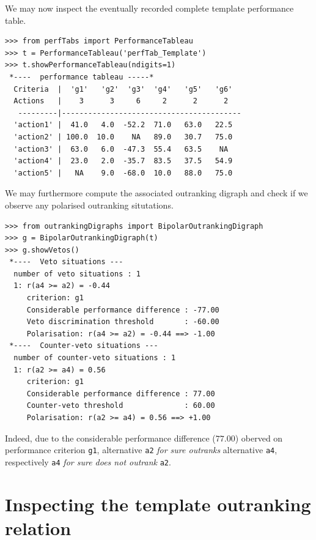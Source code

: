We may now inspect the eventually recorded complete template performance table.
\begin{lstlisting}
>>> from perfTabs import PerformanceTableau   
>>> t = PerformanceTableau('perfTab_Template')
>>> t.showPerformanceTableau(ndigits=1)
 *----  performance tableau -----*
  Criteria  |  'g1'   'g2'  'g3'  'g4'   'g5'   'g6'   
  Actions   |    3      3     6     2      2      2    
   ---------|-----------------------------------------
  'action1' |  41.0   4.0  -52.2  71.0   63.0   22.5  
  'action2' | 100.0  10.0    NA   89.0   30.7   75.0  
  'action3' |  63.0   6.0  -47.3  55.4   63.5    NA   
  'action4' |  23.0   2.0  -35.7  83.5   37.5   54.9  
  'action5' |   NA    9.0  -68.0  10.0   88.0   75.0
\end{lstlisting}

We may furthermore compute the associated outranking digraph and check if we observe any polarised outranking situtations.
\begin{lstlisting}
>>> from outrankingDigraphs import BipolarOutrankingDigraph
>>> g = BipolarOutrankingDigraph(t)
>>> g.showVetos()
 *----  Veto situations ---
  number of veto situations : 1 
  1: r(a4 >= a2) = -0.44
     criterion: g1
     Considerable performance difference : -77.00
     Veto discrimination threshold       : -60.00
     Polarisation: r(a4 >= a2) = -0.44 ==> -1.00
 *----  Counter-veto situations ---
  number of counter-veto situations : 1 
  1: r(a2 >= a4) = 0.56
     criterion: g1
     Considerable performance difference : 77.00
     Counter-veto threshold              : 60.00
     Polarisation: r(a2 >= a4) = 0.56 ==> +1.00
\end{lstlisting}
Indeed, due to the considerable performance difference ($77.00$) oberved on performance criterion \texttt{g1}, alternative \texttt{a2} \emph{for sure outranks} alternative \texttt{a4}, respectively \texttt{a4} \emph{for sure does not outrank} \texttt{a2}.

\section{Inspecting the template outranking relation}
\label{sec:5.6}

